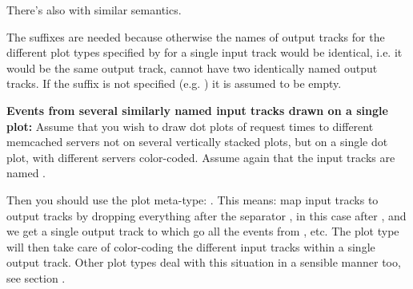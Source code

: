 \documentclass{article}
\begin{document}
There's also  with similar semantics. 

The suffixes are needed because otherwise the names of output tracks for the different plot types specified by  for a single input track would be identical, i.e. it would be the same output track, \timeplot{} cannot have two identically named output tracks. If the suffix is not specified (e.g. ) it is assumed to be empty.

\textbf{Events from several similarly named input tracks drawn on a single plot:} Assume that you wish to draw dot plots of request times to different memcached servers not on several vertically stacked plots, but on a single dot plot, with different servers color-coded. Assume again that the input tracks are named . 

Then you should use the  plot meta-type: . This means: map input tracks to output tracks by dropping everything after the separator , in this case after , and we get a single output track  to which go all the events from ,  etc. The plot type  will then take care of color-coding the different input tracks within a single output track. Other plot types deal with this situation in a sensible manner too, see section .

\pagebreak
\end{document}
